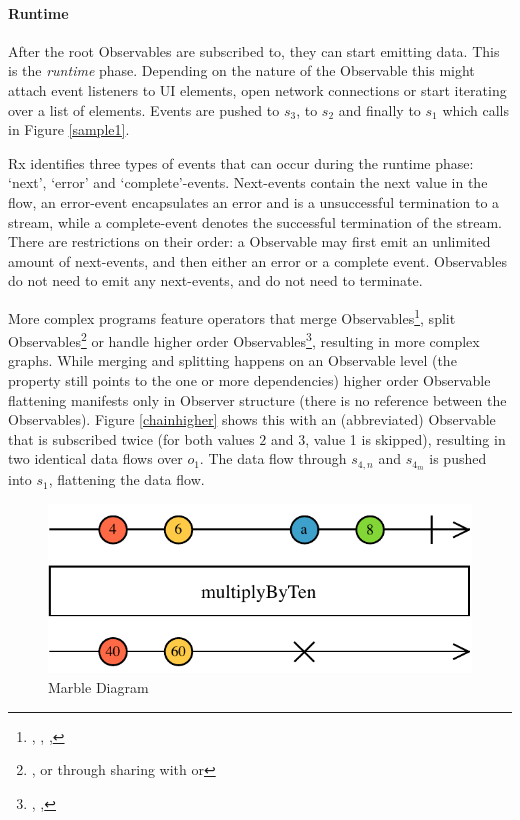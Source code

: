 \paragraph{Runtime} After the root Observables are subscribed to, they can start emitting data. This is the \emph{runtime} phase. Depending on the nature of the Observable this might attach event listeners to UI elements, open network connections or start iterating over a list of elements. Events are pushed to $s_3$, to $s_2$ and finally to $s_1$ which calls  in Figure \ref{sample1}. 

Rx identifies three types of events that can occur during the runtime phase: `next', `error' and `complete'-events. Next-events contain the next value in the flow, an error-event encapsulates an error and is a unsuccessful termination to a stream, while a complete-event denotes the successful termination of the stream. There are restrictions on their order: a Observable may first emit an unlimited amount of next-events, and then either an error or a complete event. Observables do not need to emit any next-events, and do not need to terminate.

More complex programs feature operators that merge Observables\footnote{
	, , , 
}, split Observables\footnote{
	, or through sharing with  or 
} or handle higher order Observables\footnote{
	, , 
}, resulting in more complex graphs. While merging and splitting happens on an Observable level (the  property still points to the one or more dependencies) higher order Observable flattening manifests only in Observer structure (there is no reference between the Observables). Figure \ref{chainhigher} shows this with an (abbreviated)  Observable that is subscribed twice (for both values $2$ and $3$, value 1 is skipped), resulting in two identical data flows over $o_1$. The data flow through $s_{4,n}$ and $s_{4_m}$ is pushed into $s_1$, flattening the data flow. 

\begin{figure}[t]
\centering
\includegraphics[width=\columnwidth]{images/marble-diagram.pdf}
\caption{Marble Diagram}
\label{marblediagram-image}
\end{figure}

